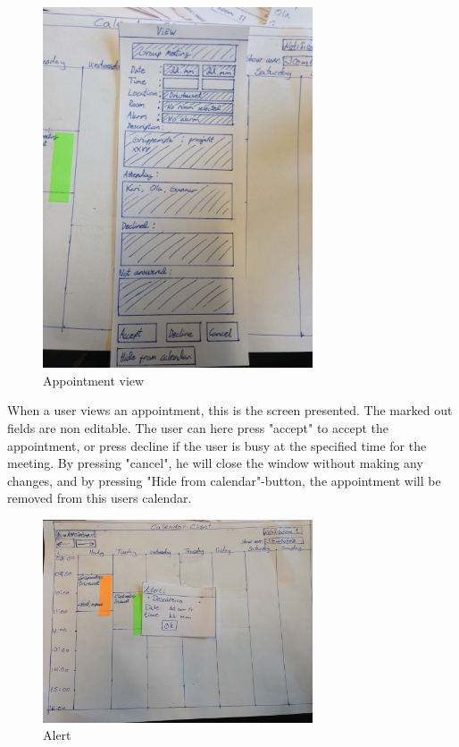\documentclass{article}
\begin{document}
\begin{figure}[h!] 
    \begin{center} 
        \includegraphics[width=8cm]{img/IMG_5609.JPG}
        \caption{Appointment view}
    \label{appointmentview}
    \end{center}
\end{figure}

When a user views an appointment, this is the screen presented. The marked out fields are non editable. The user can here press "accept" to accept the appointment, or press decline if the user is busy at the specified time for the meeting. By pressing "cancel", he will close the window without making any changes, and by pressing "Hide from calendar"-button, the appointment will be removed from this users calendar.

\newpage

\begin{figure}[h!] 
    \begin{center} 
        \includegraphics[width=8cm]{img/IMG_5611.JPG}
        \caption{Alert}
    \label{nalert}
    \end{center}
\end{figure}
\end{document}
